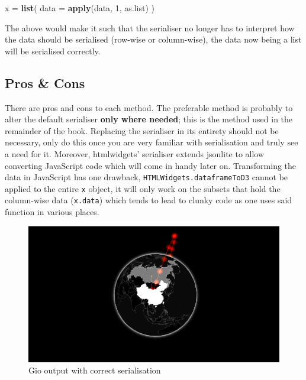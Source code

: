\documentclass[
]{krantz}
\makeatletter
\newenvironment{Shaded}{\begin{snugshade}}{\end{snugshade}}
\newcommand{\DataTypeTok}[1]{\textcolor[rgb]{0.27,0.27,0.27}{#1}}
\newcommand{\DecValTok}[1]{\textcolor[rgb]{0.06,0.06,0.06}{#1}}
\newcommand{\KeywordTok}[1]{\textcolor[rgb]{0.27,0.27,0.27}{\textbf{#1}}}
\newcommand{\NormalTok}[1]{#1}
\newcommand{\StringTok}[1]{\textcolor[rgb]{0.5,0.5,0.5}{#1}}
\newenvironment{kframe}{%
\medskip{}
\setlength{\fboxsep}{.8em}
 \def\at@end@of@kframe{}%
 \ifinner\ifhmode%
  \def\at@end@of@kframe{\end{minipage}}%
  \begin{minipage}{\columnwidth}%
 \fi\fi%
 \def\FrameCommand##1{\hskip\@totalleftmargin \hskip-\fboxsep
 \colorbox{shadecolor}{##1}\hskip-\fboxsep
     \hskip-\linewidth \hskip-\@totalleftmargin \hskip\columnwidth}%
 \MakeFramed {\advance\hsize-\width
   \@totalleftmargin\z@ \linewidth\hsize
   \@setminipage}}%
 {\par\unskip\endMakeFramed%
 \at@end@of@kframe}
\renewenvironment{Shaded}{\begin{kframe}}{\end{kframe}}
\makeatother
\begin{document}
\begin{Shaded}
\begin{Highlighting}[]
\NormalTok{x =}\StringTok{ }\KeywordTok{list}\NormalTok{(}
  \DataTypeTok{data =} \KeywordTok{apply}\NormalTok{(data, }\DecValTok{1}\NormalTok{, as.list)}
\NormalTok{)}
\end{Highlighting}
\end{Shaded}

The above would make it such that the serialiser no longer has to interpret how the data should be serialised (row-wise or column-wise), the data now being a list will be serialised correctly.

\hypertarget{widgets-full-transform-data-conclusion}{%
\subsection{Pros \& Cons}\label{widgets-full-transform-data-conclusion}}

There are pros and cons to each method. The preferable method is probably to alter the default serialiser \textbf{only where needed}; this is the method used in the remainder of the book. Replacing the serialiser in its entirety should not be necessary, only do this once you are very familiar with serialisation and truly see a need for it. Moreover, htmlwidgets' serialiser extends jsonlite to allow converting JavaScript code which will come in handy later on. Transforming the data in JavaScript has one drawback, \texttt{HTMLWidgets.dataframeToD3} cannot be applied to the entire \texttt{x} object, it will only work on the subsets that hold the column-wise data (\texttt{x.data}) which tends to lead to clunky code as one uses said function in various places.

\begin{figure}[t]

{\centering \includegraphics[width=1\linewidth]{images/gio-data} 

}

\caption{Gio output with correct serialisation}\label{fig:gio-data}
\end{figure}
\end{document}
